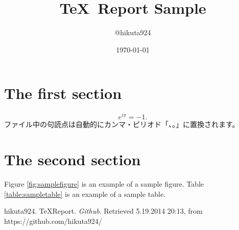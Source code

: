 
\title{\TeX\ Report Sample}
\author{@hikuta924}
\date{\today}

\maketitle

\section{The first section}
\begin{equation}
	e^{i \pi} = -1.
\end{equation}
ファイル中の句読点は自動的にカンマ・ピリオド「、。」に置換されます。

\section{The second section}
Figure \ref{fig:samplefigure} is an example of a sample figure.
Table \ref{table:sampletable} is an example of a sample table.


\begin{thebibliography}{AAA999}
     hikuta924. TeXReport. {\em Github}. Retrieved 5.19.2014 20:13, from https://github.com/hikuta924/
\end{thebibliography}

